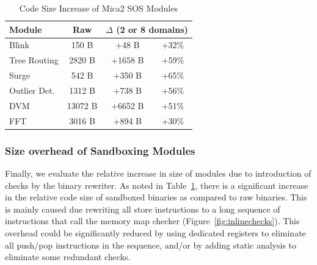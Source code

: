 \begin{table}[htdp]
\centering
\small{\def\X{\hphantom{0}}\def\XX{\X\X}
\begin{tabular}{|l|c|c|c|}
	\hline
	Module & Raw & \multicolumn{2}{c|}{$\Delta$ (2 or 8 domains)} \\
	\hline
	Blink\raise1pt\hbox{\strut} & \XX{}150 B & \XX{}+48 B & +32\%\\
	Tree Routing & \X{}2820 B & +1658 B & +59\%\\
	Surge & \XX{}542 B & \X{}+350 B & +65\%\\
	Outlier Det. & \X{}1312 B & \X{}+738 B & +56\% \\
	DVM & 13072 B & +6652 B & +51\%\\
	FFT & \X{}3016 B & \X{}+894 B & +30\% \\
	\hline
\end{tabular}}
\caption{Code Size Increase of Mica2 SOS Modules}
\label{tab:module_size_comparison}
\end{table}

\subsubsection{Size overhead of Sandboxing Modules}
%
Finally, we evaluate the relative increase in size of modules due to
introduction of checks by the binary rewriter.
%
As noted in Table~\ref{tab:module_size_comparison}, there is a significant
increase in the relative code size of sandboxed binaries as compared to raw
binaries.
%
This is mainly caused due rewriting all store instructions to a long
sequence of instructions that call the memory map checker
(Figure~\ref{fig:inlinechecks}).
% 
This overhead could be significantly reduced by using dedicated registers
to eliminate all push/pop instructions in the sequence, and/or by adding
static analysis to eliminate some redundant checks.
%
%
